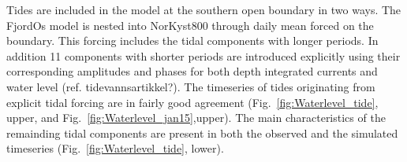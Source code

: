 \documentclass[12pt,a4paper,english]{article}
\begin{document}
Tides are included in the model at the southern open boundary in two ways. The FjordOs model is nested into NorKyst800 through daily mean forced on the boundary. This forcing includes the tidal components with longer periods. In addition 11 components with shorter periods are introduced explicitly using their corresponding amplitudes and phases for both depth integrated currents and water level (ref. tidevannsartikkel?). The timeseries of tides originating from explicit tidal forcing are in fairly good agreement (Fig.~\ref{fig:Waterlevel_tide}, upper, and Fig.~\ref{fig:Waterlevel_jan15},upper). The main characteristics of the remainding tidal components are present in both the observed and the simulated timeseries (Fig.~\ref{fig:Waterlevel_tide}, lower).
 
\end{document}
